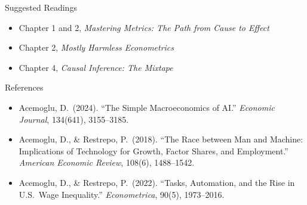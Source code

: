 \documentclass[hyperref={pdfpagelabels=false}]{beamer}
\begin{document}
	\begin{frame}{Suggested Readings}
		\begin{itemize}
			\item Chapter 1 and 2, \textit{Mastering Metrics: The Path from Cause to Effect}
			\vspace{0.2cm}
			\item Chapter 2, \textit{Mostly Harmless Econometrics}
			\vspace{0.2cm}
			\item Chapter 4, \textit{Causal Inference: The Mixtape}
		\end{itemize}
	\end{frame}


    \begin{frame}{References}
	\begin{itemize}\footnotesize
		\item Acemoglu, D.\ (2024). ``The Simple Macroeconomics of AI.'' \textit{Economic Journal}, 134(641), 3155--3185.
\vspace{0.15cm}
\item Acemoglu, D., \& Restrepo, P.\ (2018). ``The Race between Man and Machine: Implications of Technology for Growth, Factor Shares, and Employment.'' \textit{American Economic Review}, 108(6), 1488--1542.
\vspace{0.15cm}
\item Acemoglu, D., \& Restrepo, P.\ (2022). ``Tasks, Automation, and the Rise in U.S.\ Wage Inequality.'' \textit{Econometrica}, 90(5), 1973--2016.
	\end{itemize}
\end{frame}
	
\end{document}

